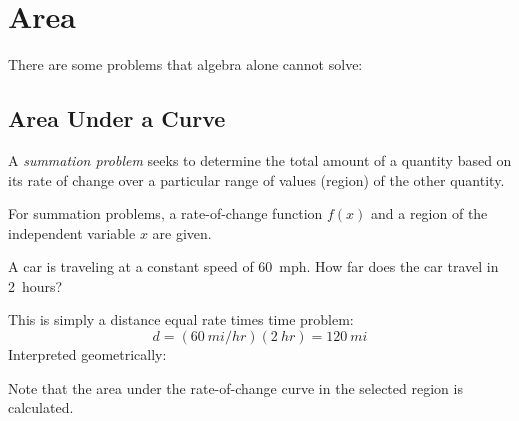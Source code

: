 \documentclass[letterpaper,12pt,fleqn]{article}
\begin{document}
\section*{Area}

There are some problems that algebra alone cannot solve:

\subsection*{Area Under a Curve}

\begin{definition}
  A \emph{summation problem} seeks to determine the total amount of a quantity based on its rate of change over
  a particular range of values (region) of the other quantity.
\end{definition}

For summation problems, a rate-of-change function \(f(x)\) and a region of the independent variable \(x\) are
given.

\begin{example}
  A car is traveling at a constant speed of \SI{60}{mph}.  How far does the car travel in \SI{2}{hours}?

  This is simply a distance equal rate times time problem:
  \[d=(\SI{60}{mi/hr})(\SI{2}{hr})=\SI{120}{mi}\]
  Interpreted geometrically:

  \bigskip

  \begin{center}
  \end{center}

  \bigskip

  Note that the area under the rate-of-change curve in the selected region is calculated.
\end{example}
\end{document}
